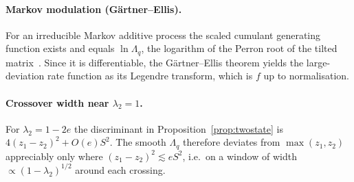 \documentclass[11pt]{article}
\theoremstyle{definition}\newtheorem{definition}{Definition}[section]
\theoremstyle{remark}\newtheorem*{remark}{Remark}
\begin{document}
\paragraph{Markov modulation (G\"artner--Ellis).} For an irreducible Markov additive process the scaled
cumulant generating function exists and equals $\ln\Lambda_q$, the logarithm of the Perron root of the tilted
matrix~\cite{DemboZeitouni}. Since it is differentiable, the G\"artner--Ellis theorem yields the large-deviation
rate function as its Legendre transform, which is $f$ up to normalisation.

\paragraph{Crossover width near $\lambda_2=1$.} For $\lambda_2=1-2e$ the discriminant in Proposition~\ref{prop:twostate}
is $4(z_1-z_2)^2+O(e)S^2$. The smooth $\Lambda_q$ therefore deviates from $\max(z_1,z_2)$ appreciably only where
$(z_1-z_2)^2\lesssim eS^2$, i.e.\ on a window of width $\propto(1-\lambda_2)^{1/2}$ around each crossing.
\end{document}
